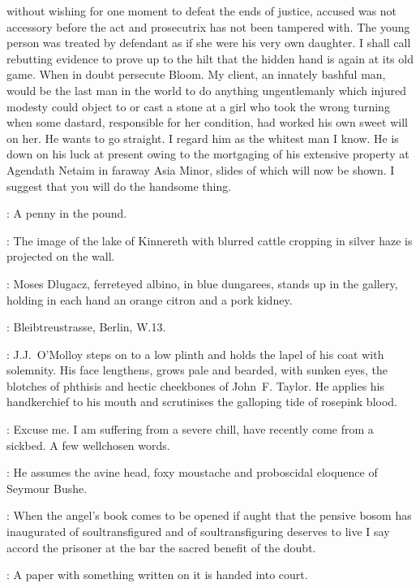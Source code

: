 without wishing for one moment to defeat the ends of justice,
accused was not accessory before the act and prosecutrix has not been tampered with.
The young person was treated by defendant as if she were his very own daughter.
I shall call rebutting evidence to prove up to the hilt
that the hidden hand is again at its old game.
When in doubt persecute Bloom.
My client,
an innately bashful man,
would be the last man in the world
to do anything ungentlemanly which injured modesty could object to
or cast a stone at a girl who took the wrong turning when some dastard,
responsible for her condition,
had worked his own sweet will on her.
He wants to go straight.
I regard him as the whitest man I know.
He is down on his luck at present owing to the mortgaging of his extensive property
at Agendath Netaim in faraway Asia Minor,
slides of which will now be shown.
I suggest that you will do the handsome thing.

\Bloom:
A penny in the pound.

:
The image of the lake of Kinnereth with blurred cattle cropping in silver haze
is projected on the wall.

:
Moses Dlugacz,
ferreteyed albino,
in blue dungarees,
stands up in the gallery,
holding in each hand an orange citron and a pork kidney.

\Dlugacz:
Bleibtreustrasse,
Berlin,
W.13.

:
J.J.~O'Molloy steps on to a low plinth
and holds the lapel of his coat with solemnity.
His face lengthens,
grows pale and bearded,
with sunken eyes,
the blotches of phthisis and hectic cheekbones of John~F.
Taylor.
He applies his handkerchief to his mouth
and scrutinises the galloping tide of rosepink blood.

\JJOM:
Excuse me.
I am suffering from a severe chill,
have recently come from a sickbed.
A few wellchosen words.

:
He assumes the avine head,
foxy moustache
and proboscidal eloquence of Seymour Bushe.

\JJOM:
When the angel's book comes to be opened
if aught that the pensive bosom has inaugurated of
soultransfigured and of soultransfiguring deserves to live
I say accord the prisoner at the bar the sacred benefit of the doubt.

:
A paper with something written on it is handed into court.


